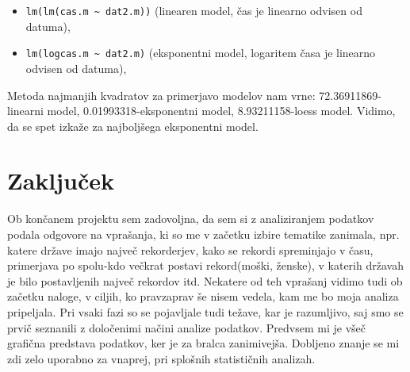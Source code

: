 \documentclass[11pt,a4paper]{article}
\begin{document}
\begin{itemize}
\item{\verb|lm(lm(cas.m ~ dat2.m))| (linearen model, čas je linearno odvisen od datuma),}
\item{\verb|lm(logcas.m ~ dat2.m)| (eksponentni model, logaritem časa je linearno odvisen od datuma),}
\end{itemize}

Metoda najmanjih kvadratov za primerjavo modelov nam vrne: 72.36911869-linearni model, 0.01993318-eksponentni model, 8.93211158-loess model. Vidimo, da se spet izkaže za najboljšega eksponentni model.


\section{Zaključek}
Ob končanem projektu sem zadovoljna, da sem si z analiziranjem podatkov podala odgovore na vprašanja, ki so me v začetku izbire tematike zanimala, npr. katere države imajo največ rekorderjev, kako se rekordi spreminjajo v času, primerjava po spolu-kdo večkrat postavi rekord(moški, ženske), v katerih državah je bilo postavljenih največ rekordov itd. Nekatere od teh vprašanj vidimo tudi ob začetku naloge, v ciljih, ko pravzaprav še nisem vedela, kam me bo moja analiza pripeljala. Pri vsaki fazi so se pojavljale tudi težave, kar je razumljivo, saj smo se prvič seznanili z določenimi načini analize podatkov. Predvsem mi je všeč grafična predstava podatkov, ker je za bralca zanimivejša. Dobljeno znanje se mi zdi zelo uporabno za vnaprej, pri splošnih statističnih analizah. 
\end{document}
